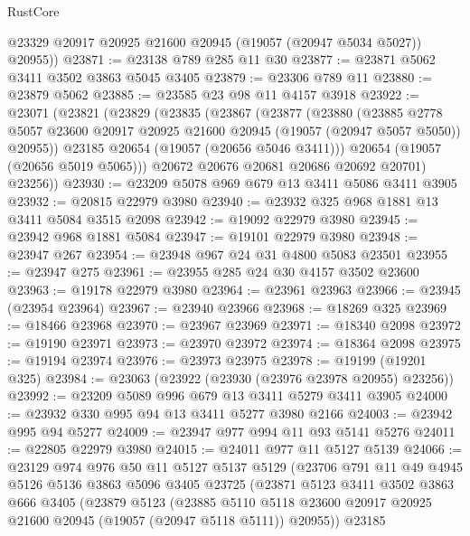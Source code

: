 \begin{lexlean}{RustCore}
\begin{coremodule}
        @23329
        @20917
        @20925
        @21600
        @20945
        (@19057 (@20947 @5034 @5027))
        @20955))
@23871 := @23138 @789 @285 @11 @30
@23877 := @23871 @5062 @3411 @3502 @3863 @5045 @3405
@23879 := @23306 @789 @11
@23880 := @23879 @5062
@23885 := @23585 @23 @98 @11 @4157 @3918
@23922 := @23071
    (@23821
      (@23829
        (@23835
          (@23867
            (@23877
              (@23880
                (@23885
                  @2778
                  @5057
                  @23600
                  @20917
                  @20925
                  @21600
                  @20945
                  (@19057 (@20947 @5057 @5050))
                  @20955))
              @23185
              @20654
              (@19057 (@20656 @5046 @3411)))
            @20654
            (@19057 (@20656 @5019 @5065)))
          @20672
          @20676
          @20681
          @20686
          @20692
          @20701)
        @23256))
@23930 := @23209 @5078 @969 @679 @13 @3411 @5086 @3411 @3905
@23932 := @20815 @22979 @3980
@23940 := @23932 @325 @968 @1881 @13 @3411 @5084 @3515 @2098
@23942 := @19092 @22979 @3980
@23945 := @23942 @968 @1881 @5084
@23947 := @19101 @22979 @3980
@23948 := @23947 @267
@23954 := @23948 @967 @24 @31 @4800 @5083 @23501
@23955 := @23947 @275
@23961 := @23955 @285 @24 @30 @4157 @3502 @23600
@23963 := @19178 @22979 @3980
@23964 := @23961 @23963
@23966 := @23945 (@23954 @23964)
@23967 := @23940 @23966
@23968 := @18269 @325
@23969 := @18466 @23968
@23970 := @23967 @23969
@23971 := @18340 @2098
@23972 := @19190 @23971
@23973 := @23970 @23972
@23974 := @18364 @2098
@23975 := @19194 @23974
@23976 := @23973 @23975
@23978 := @19199 (@19201 @325)
@23984 := @23063 (@23922 (@23930 (@23976 @23978 @20955) @23256))
@23992 := @23209 @5089 @996 @679 @13 @3411 @5279 @3411 @3905
@24000 := @23932 @330 @995 @94 @13 @3411 @5277 @3980 @2166
@24003 := @23942 @995 @94 @5277
@24009 := @23947 @977 @994 @11 @93 @5141 @5276
@24011 := @22805 @22979 @3980
@24015 := @24011 @977 @11 @5127 @5139
@24066 := @23129
    @974
    @976
    @50
    @11
    @5127
    @5137
    @5129
    (@23706
      @791
      @11
      @49
      @4945
      @5126
      @5136
      @3863
      @5096
      @3405
      @23725
      (@23871
        @5123
        @3411
        @3502
        @3863
        @666
        @3405
        (@23879
          @5123
          (@23885
            @5110
            @5118
            @23600
            @20917
            @20925
            @21600
            @20945
            (@19057 (@20947 @5118 @5111))
            @20955))
        @23185

\end{coremodule}
\end{lexlean}
